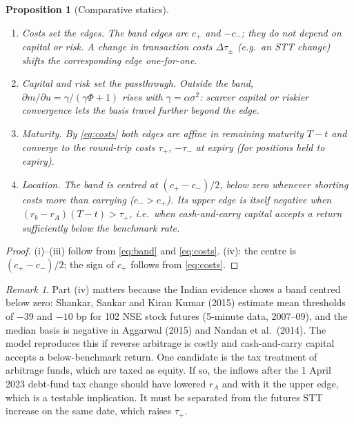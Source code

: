 \documentclass[11pt,a4paper]{article}
\theoremstyle{plain}
\newtheorem{proposition}{Proposition}
\theoremstyle{definition}
\theoremstyle{remark}
\newtheorem*{remark}{Remark}
\begin{document}
\begin{proposition}[Comparative statics]\label{prop:cs}
\begin{enumerate}[label=(\roman*),leftmargin=1.8em,itemsep=1pt]
\item \emph{Costs set the edges.} The band edges are $c_+$ and $-c_-$; they do not depend on capital or risk. A change in
transaction costs $\Delta\tau_\pm$ (e.g.\ an STT change) shifts the corresponding edge one-for-one.
\item \emph{Capital and risk set the passthrough.} Outside the band, $\partial m/\partial u=\gamma/(\gamma\Phi+1)$ rises with
$\gamma=\alpha\sigma^2$: scarcer capital or riskier convergence lets the basis travel further beyond the edge.
\item \emph{Maturity.} By \eqref{eq:costs} both edges are affine in remaining maturity $T-t$ and converge to the round-trip
costs $\tau_+$, $-\tau_-$ at expiry (for positions held to expiry).
\item \emph{Location.} The band is centred at $(c_+-c_-)/2$, below zero whenever shorting costs more than carrying
($c_->c_+$). Its \emph{upper} edge is itself negative when $(r_b-r_A)(T-t)>\tau_+$, i.e.\ when cash-and-carry capital
accepts a return sufficiently below the benchmark rate.
\end{enumerate}
\end{proposition}
\begin{proof}
(i)--(iii) follow from \eqref{eq:band} and \eqref{eq:costs}. (iv): the centre is $(c_+-c_-)/2$; the sign of $c_+$
follows from \eqref{eq:costs}.
\end{proof}

\begin{remark}
Part (iv) matters because the Indian evidence shows a band centred below zero: Shankar, Sankar and Kiran Kumar (2015)
estimate mean thresholds of $-39$ and $-10$ bp for 102 NSE stock futures (5-minute data, 2007--09), and the median basis
is negative in Aggarwal (2015) and Nandan et al.\ (2014). The model reproduces this if reverse arbitrage is costly and
cash-and-carry capital accepts a below-benchmark return. One candidate is the tax treatment of arbitrage funds, which
are taxed as equity. If so, the inflows after the 1 April 2023 debt-fund tax change should have lowered $r_A$ and with it
the upper edge, which is a testable implication. It must be separated from the futures STT increase on the same date, which
raises $\tau_+$.
\end{remark}

\end{document}

